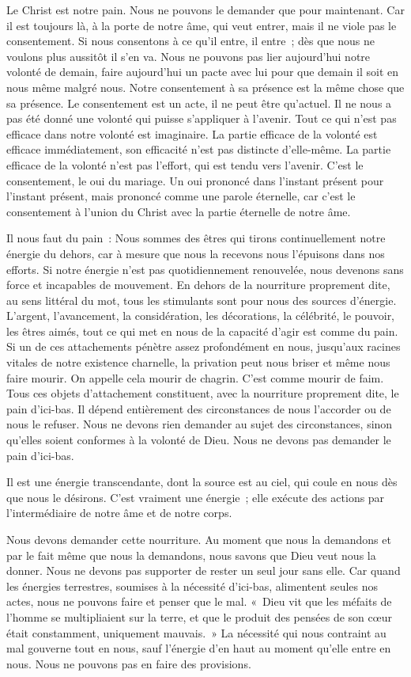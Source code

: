 \documentclass[french,twoside]{book} %
\begin{document}
\noindent Le Christ est notre pain. Nous ne pouvons le demander que pour maintenant. Car il est toujours là, à la porte de notre âme, qui veut entrer, mais il ne viole pas le consentement. Si nous consentons à ce qu'il entre, il entre ; dès que nous ne voulons plus aussitôt il s'en va. Nous ne pouvons pas lier aujourd'hui notre volonté de demain, faire aujourd'hui un pacte avec lui pour que demain il soit en nous même malgré nous. Notre consentement à sa présence est la même chose que sa présence. Le consentement est un acte, il ne peut être qu'actuel. Il ne nous a pas été donné une volonté qui puisse s'appliquer à l'avenir. Tout ce qui n'est pas efficace dans notre volonté est imaginaire. La partie efficace de la volonté est efficace immédiatement, son efficacité n'est pas distincte d'elle-même. La partie efficace de la volonté n'est pas l'effort, qui est tendu vers l'avenir. C'est le consentement, le oui du mariage. Un oui prononcé dans l'instant présent pour l'instant présent, mais prononcé comme une parole éternelle, car c'est le consentement à l'union du Christ avec la partie éternelle de notre âme.\par
Il nous faut du pain : Nous sommes des êtres qui tirons continuellement notre énergie du dehors, car à mesure que nous la recevons nous l'épuisons dans nos efforts. Si notre énergie n'est pas quotidiennement renouvelée, nous devenons sans force et incapables de mouvement. En dehors de la nourriture proprement dite, au sens littéral du mot, tous les stimulants sont pour nous des sources d'énergie. L'argent, l'avancement, la considération, les décorations, la célébrité, le pouvoir, les êtres aimés, tout ce qui met en nous de la capacité d'agir est comme du pain. Si un de ces attachements pénètre assez profondément en nous, jusqu'aux racines vitales de notre existence charnelle, la privation peut nous briser et même nous faire mourir. On appelle cela mourir de chagrin. C'est comme mourir de faim. Tous ces objets d'attachement constituent, avec la nourriture proprement dite, le pain d'ici-bas. Il dépend entièrement des circonstances de nous l'accorder ou de nous le refuser. Nous ne devons rien demander au sujet des circonstances, sinon qu'elles soient conformes à la volonté de Dieu. Nous ne devons pas demander le pain d'ici-bas.\par
Il est une énergie transcendante, dont la source est au ciel, qui coule en nous dès que nous le désirons. C'est vraiment une énergie ; elle exécute des actions par l'intermédiaire de notre âme et de notre corps.\par
Nous devons demander cette nourriture. Au moment que nous la demandons et par le fait même que nous la demandons, nous savons que Dieu veut nous la donner. Nous ne devons pas supporter de rester un seul jour sans elle. Car quand les énergies terrestres, soumises à la nécessité d'ici-bas, alimentent seules nos actes, nous ne pouvons faire et penser que le mal. « Dieu vit que les méfaits de l'homme se multipliaient sur la terre, et que le produit des pensées de son cœur était constamment, uniquement mauvais. » La nécessité qui nous contraint au mal gouverne tout en nous, sauf l'énergie d'en haut au moment qu'elle entre en nous. Nous ne pouvons pas en faire des provisions.\par
\end{document}
